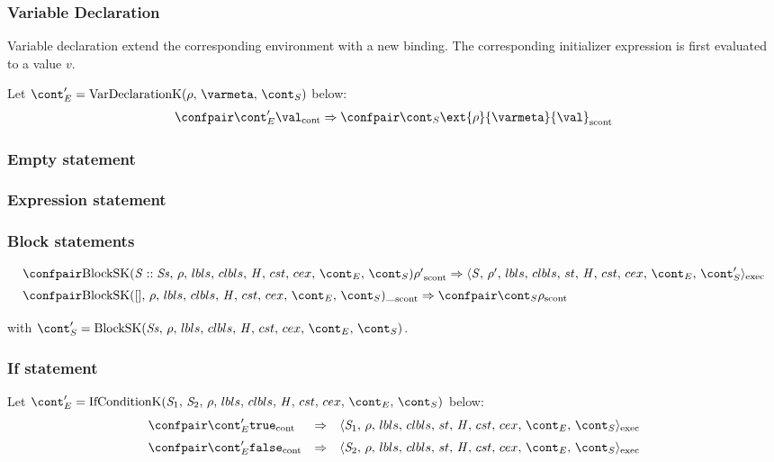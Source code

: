 \documentclass{article}
\newcommand{\cesktrans}[2]{\ensuremath{{#1} \Rightarrow {#2}}}
\begin{document}
\subsubsection{Variable Declaration}
Variable declaration extend the corresponding environment with a new binding.
The corresponding initializer expression is first evaluated to a value $v$.

\noindent
Let $\econt' = \VarDeclK{\env}{\varmeta}{\scont}$ below:
\[
  \begin{array}{lcl}
	\cesktrans{
		\contconf{\econt'}{\val}}{
		\scontconf{\scont}{\ext{\env}{\varmeta}{\val}}}
  \end{array}
\]

\subsubsection{Empty statement}
\label{subsubsec:emtpy-stmt}


\subsubsection{Expression statement}
\label{expression-stmt}

\subsubsection{Block statements}
\[
  \begin{array}{lcl}
	\cesktrans{
		\scontconf{\BlockSK{\stmt :: \stmts}{\env}}{\env'}}{
		\execconf{\stmt}{\env'}{\lbls}{\clbls}{\handler}{\cstrace}{\cex}{\econt}{\scont'}}
		\\[2mm]

	\cesktrans{
		\scontconf{\BlockSK{[]}{\env}}{ \_ }}{
		\scontconf{\scont}{\env}}
		\\[2mm]
  \end{array}
\]
\noindent
with $\scont' = \BlockSK{\stmts}{\env}$.

\subsubsection{If statement}

Let $\econt' = \IfCondK{\stmti{1}}{\stmti{2}}$ below:
\[
  \begin{array}{lcl}
	\contconf{\econt'}{\true}
	& \Rightarrow &
	\execconf{\stmti{1}}{\env}{\lbls}{\clbls}{\handler}{\cstrace}{\cex}{\econt}{\scont}\\[2mm]

	\contconf{\econt'}{\false}
	& \Rightarrow &
	\execconf{\stmti{2}}{\env}{\lbls}{\clbls}{\handler}{\cstrace}{\cex}{\econt}{\scont}\\
  \end{array}
\]
\end{document}
